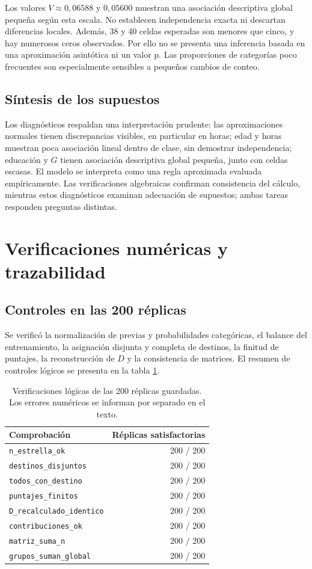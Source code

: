 \documentclass[11pt,a4paper]{article}
\begin{document}
Los valores $V\approx0,06588$ y $0,05600$ muestran una asociación descriptiva global pequeña según esta escala. No establecen independencia exacta ni descartan diferencias locales. Además, 38 y 40 celdas esperadas son menores que cinco, y hay numerosos ceros observados. Por ello no se presenta una inferencia basada en una aproximación asintótica ni un valor p. Las proporciones de categorías poco frecuentes son especialmente sensibles a pequeños cambios de conteo.

\subsection{Síntesis de los supuestos}
Los diagnósticos respaldan una interpretación prudente: las aproximaciones normales tienen discrepancias visibles, en particular en horas; edad y horas muestran poca asociación lineal dentro de clase, sin demostrar independencia; educación y $G$ tienen asociación descriptiva global pequeña, junto con celdas escasas. El modelo se interpreta como una regla aproximada evaluada empíricamente. Las verificaciones algebraicas confirman consistencia del cálculo, mientras estos diagnósticos examinan adecuación de supuestos; ambas tareas responden preguntas distintas.

\section{Verificaciones numéricas y trazabilidad}
\subsection{Controles en las 200 réplicas}
Se verificó la normalización de previas y probabilidades categóricas, el balance del entrenamiento, la asignación disjunta y completa de destinos, la finitud de puntajes, la reconstrucción de $D$ y la consistencia de matrices. El resumen de controles lógicos se presenta en la tabla \ref{tab:verificaciones}.

\begin{table}[H]
\centering
\caption[Verificaciones lógicas de las 200 réplicas guardadas.]{Verificaciones lógicas de las 200 réplicas guardadas. Los errores numéricos se informan por separado en el texto.}\label{tab:verificaciones}
\small
\setlength{\tabcolsep}{4pt}
\begin{tabular}{lr}
\toprule
Comprobación & Réplicas satisfactorias \\
\midrule
\texttt{n\_estrella\_ok} & 200 / 200 \\
\texttt{destinos\_disjuntos} & 200 / 200 \\
\texttt{todos\_con\_destino} & 200 / 200 \\
\texttt{puntajes\_finitos} & 200 / 200 \\
\texttt{D\_recalculado\_identico} & 200 / 200 \\
\texttt{contribuciones\_ok} & 200 / 200 \\
\texttt{matriz\_suma\_n} & 200 / 200 \\
\texttt{grupos\_suman\_global} & 200 / 200 \\
\bottomrule
\end{tabular}
\end{table}
\end{document}
